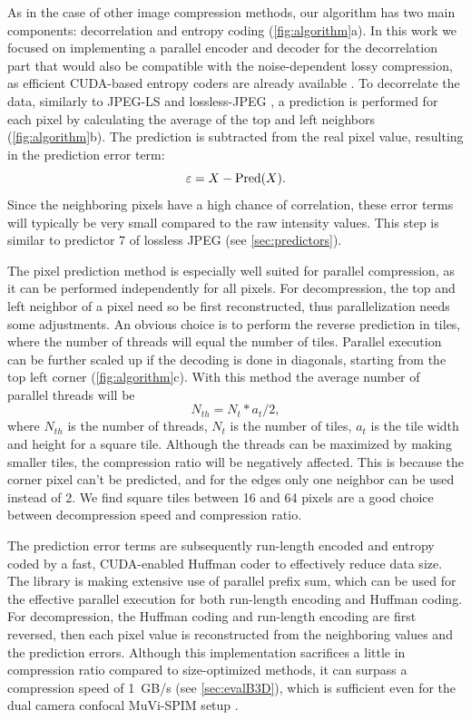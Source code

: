     As in the case of other image compression methods, our algorithm has two main components: decorrelation and entropy coding (\autoref{fig:algorithm}a). In this work we focused on implementing a parallel encoder and decoder for the decorrelation part that would also be compatible with the noise-dependent lossy compression, as efficient CUDA-based entropy coders are already available \cite{treib_interactive_2012}. To decorrelate the data, similarly to JPEG-LS and lossless-JPEG \cite{pennebaker_jpeg:_1992}, a prediction is performed for each pixel by calculating the average of the top and left neighbors (\autoref{fig:algorithm}b). The prediction is subtracted from the real pixel value, resulting in the prediction error term:
    \begin{equation}
      \varepsilon = X - \operatorname{Pred}(X).
    \end{equation}
    Since the neighboring pixels have a high chance of correlation, these error terms will typically be very small compared to the raw intensity values. This step is similar to predictor 7 of lossless JPEG (see \ref{sec:predictors}).

    The pixel prediction method is especially well suited for parallel compression, as it can be performed independently for all pixels. For decompression, the top and left neighbor of a pixel need so be first reconstructed, thus parallelization needs some adjustments. An obvious choice is to perform the reverse prediction in tiles, where the number of threads will equal the number of tiles. Parallel execution can be further scaled up if the decoding is done in diagonals, starting from the top left corner (\autoref{fig:algorithm}c). With this method the average number of parallel threads will be
    \begin{equation}
      N_{th} = N_t * a_t / 2,
      \label{eq:numThreads}
    \end{equation}
    where $N_{th}$ is the number of threads, $N_t$ is the number of tiles, $a_t$ is the tile width and height for a square tile. Although the threads can be maximized by making smaller tiles, the compression ratio will be negatively affected. This is because the corner pixel can't be predicted, and for the edges only one neighbor can be used instead of 2. We find square tiles between 16 and 64 pixels are a good choice between decompression speed and compression ratio.
    
    The prediction error terms are subsequently run-length encoded and entropy coded by a fast, CUDA-enabled Huffman coder \cite{treib_interactive_2012,treib_turbulence_2012} to effectively reduce data size. The library is making extensive use of parallel prefix sum, which can be used for the effective parallel execution for both run-length encoding and Huffman coding. For decompression, the Huffman coding and run-length encoding are first reversed, then each pixel value is reconstructed from the neighboring values and the prediction errors. Although this implementation sacrifices a little in compression ratio compared to size-optimized methods, it can surpass a compression speed of \SI{1}{GB/s} (see \autoref{sec:evalB3D}), which is sufficient even for the dual camera confocal MuVi-SPIM setup \cite{de_medeiros_confocal_2015}.
    

